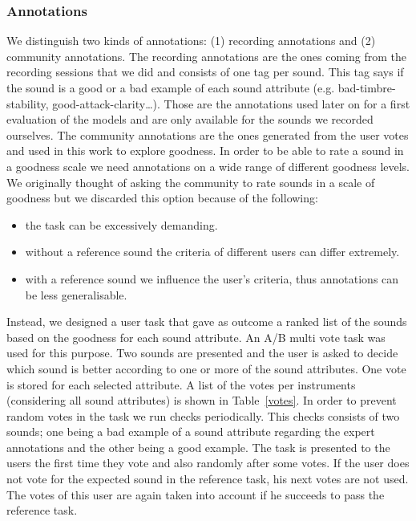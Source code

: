 \documentclass{article}
\begin{document}
\subsubsection{Annotations}
We distinguish two kinds of annotations: (1) recording annotations and (2) community annotations. The recording annotations are the ones coming from the recording sessions that we did and consists of one tag per sound. This tag says if the sound is a good or a bad example of each sound attribute (e.g. bad-timbre-stability, good-attack-clarity…). Those are the annotations used later on for a first evaluation of the models and are only available for the sounds we recorded ourselves.
The community annotations are the ones generated from the user votes and used in this work to explore goodness. In order to be able to rate a sound in a goodness scale we need annotations on a wide range of different goodness levels. We originally thought of asking the community to rate sounds in a scale of goodness but we discarded this option because of the following:

\begin{itemize}
	\item{the task can be excessively demanding.}
	\item{without a reference sound the criteria of different users can differ extremely.}
	\item{with a reference sound we influence the user’s criteria, thus annotations can be less 	generalisable.}
\end{itemize}

Instead, we designed a user task that gave as outcome a ranked list of the sounds based on the goodness for each sound attribute. An A/B multi vote task was used for this purpose. Two sounds are presented and the user is asked to decide which sound is better according to one or more of the sound attributes. One vote is stored for each selected attribute. A list of the votes per instruments (considering all sound attributes) is shown in Table~\ref{votes}.
In order to prevent random votes in the task we run checks periodically. This checks consists of two sounds; one being a bad example of a sound attribute regarding the expert annotations and the other being a good example. The task is presented to the users the first time they vote and also randomly after some votes. If the user does not vote for the expected sound in the reference task, his next votes are not used. The votes of this user are again taken into account if he succeeds to pass the reference task. 
\end{document}
